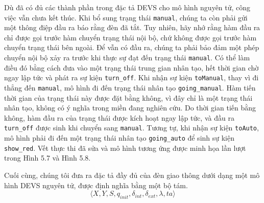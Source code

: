 
Dù đã có đủ các thành phần trong đặc tả DEVS cho mô hình nguyên tử, công việc vẫn chưa kết thúc. Khi bổ sung trạng thái \texttt{manual}, chúng ta còn phải gửi một thông điệp đầu ra báo rằng đèn đã tắt. Tuy nhiên, hãy nhớ rằng hàm đầu ra chỉ được gọi trước hàm chuyển trạng thái nội bộ, chứ không được gọi trước hàm chuyển trạng thái bên ngoài. Để vẫn có đầu ra, chúng ta phải bảo đảm một phép chuyển nội bộ xảy ra trước khi thực sự đạt đến trạng thái \texttt{manual}. Có thể làm điều đó bằng cách đưa vào một trạng thái trung gian nhân tạo, hết thời gian chờ ngay lập tức và phát ra sự kiện \texttt{turn\_off}. Khi nhận sự kiện \texttt{toManual}, thay vì đi thẳng đến \texttt{manual}, mô hình đi đến trạng thái nhân tạo \texttt{going\_manual}. Hàm tiến thời gian của trạng thái này được đặt bằng không, vì đây chỉ là một trạng thái nhân tạo, không có ý nghĩa trong miền đang nghiên cứu. Do thời gian tiến bằng không, hàm đầu ra của trạng thái được kích hoạt ngay lập tức, và đầu ra \texttt{turn\_off} được sinh khi chuyển sang \texttt{manual}. Tương tự, khi nhận sự kiện \texttt{toAuto}, mô hình phải đi đến một trạng thái nhân tạo \texttt{going\_auto} để sinh sự kiện \texttt{show\_red}. Vết thực thi đã sửa và mô hình tương ứng được minh họa lần lượt trong Hình 5.7 và Hình 5.8.

Cuối cùng, chúng tôi đưa ra đặc tả đầy đủ của đèn giao thông dưới dạng một mô hình DEVS nguyên tử, được định nghĩa bằng một bộ tám.
\[
\langle X,Y,S,q_{init},\delta_{int},\delta_{ext},\lambda,ta\rangle
\]


